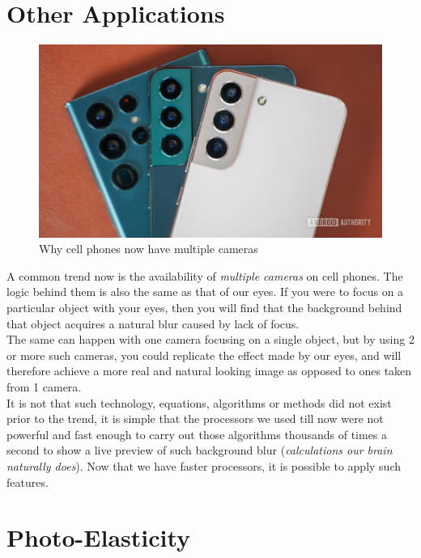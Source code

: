 \documentclass[11pt]{article}
\begin{document}
\section{Other Applications}
\begin{figure}[H]
	\centering
	\includegraphics[scale=.2]{phone cameras.jpg}
	\caption{Why cell phones now have multiple cameras}
	\label{fig:This figure}
\end{figure}

A common trend now is the availability of \textit{multiple cameras} on cell phones. The logic behind them is also the same as that of our eyes. If you were to focus on a particular object with your eyes, then you will find that the background behind that object acquires a natural blur caused by lack of focus.\\

The same can happen with one camera focusing on a single object, but by using 2 or more such cameras, you could replicate the effect made by our eyes, and will therefore achieve a more real and natural looking image as opposed to ones taken from 1 camera.\\

It is not that such technology, equations, algorithms or methods did not exist prior to the trend, it is simple that the processors we used till now were not powerful and fast enough to carry out those algorithms thousands of times a second to show a live preview of such background blur (\textit{calculations our brain naturally does}). Now that we have faster processors, it is possible to apply such features.

\section{Photo-Elasticity}
\end{document}
